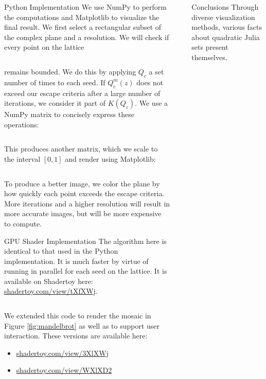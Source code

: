 \documentclass[final]{beamer}
\newlength{\sepwidth}
\newlength{\colwidth}
\newcommand{\separatorcolumn}{\begin{column}{\sepwidth}\end{column}}
\begin{document}
\begin{frame}[t]
\begin{columns}[t]
\begin{column}{\colwidth}
	\begin{block}{Python Implementation}
		We use NumPy to perform the computations and Matplotlib
		to visualize the final result.
		We first select a rectangular subset of the complex plane
		and a resolution. We will check if every point on the lattice
		\inputminted[firstline=102,lastline=103]{python}{../visualize.py}
		remains bounded.
		We do this by applying $Q_c$ a set number of times to each seed.
		If $Q^{m}_c(z)$ does not exceed our escape criteria after a large number
		of iterations, we consider it part of $K(Q_c)$.
		We use a NumPy matrix to concisely express these operations:
		\inputminted[firstline=108,lastline=113]{python}{../visualize.py}
		This produces another matrix, which we scale to the interval
		$[0, 1]$ and render using Matplotlib:
		\inputminted[firstline=118,lastline=118]{python}{../visualize.py}
		To produce a better image, we color the plane
		by how quickly each point exceeds the escape criteria.
		More iterations and a higher resolution
		will result in more accurate images, but will be more expensive to compute.
	\end{block}

	\begin{block}{GPU Shader Implementation}
		The algorithm here is identical to that used in the Python
		implementation.
		It is much faster by virtue of running in parallel for each seed
		on the lattice.
		It is available on Shadertoy here: \href{https://www.shadertoy.com/view/tXfXWj}{shadertoy.com/view/tXfXWj}.
		\inputminted[firstline=271,lastline=278]{glsl}{../render.glsl}

		We extended this code to render the mosaic in Figure \ref{fig:mandelbrot}
		as well as to support user interaction.
		These versions are available here:
		\begin{multicols}{2}
			\begin{itemize}
				\item \href{https://www.shadertoy.com/view/3XlXWj}{shadertoy.com/view/3XlXWj} \item \href{https://www.shadertoy.com/view/WXlXD2}{shadertoy.com/view/WXlXD2}
			\end{itemize}
		\end{multicols}
	\end{block}
\end{column}

\separatorcolumn

\begin{column}{\colwidth}
	\begin{block}{Conclusions}
		Through diverse visualization methods, various facts about
		quadratic Julia sets present themselves.


\end{block}
\end{column}
\end{columns}
\end{frame}
\end{document}
